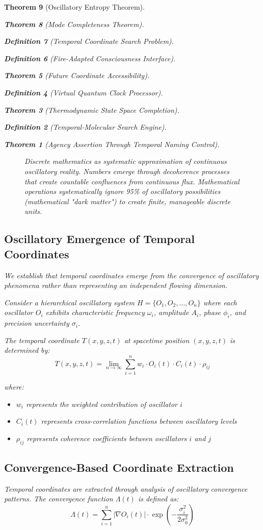 \documentclass[12pt,a4paper]{article}
\newtheorem{theorem}{Theorem}[section]
\newtheorem{definition}[theorem]{Definition}
\begin{document}
\begin{theorem}[Oscillatory Entropy Theorem]
\begin{theorem}[Mode Completeness Theorem]
\begin{enumerate}
\begin{definition}[Temporal Coordinate Search Problem]
\begin{algorithm}
\begin{definition}[Fire-Adapted Consciousness Interface]
\begin{theorem}[Future Coordinate Accessibility]
\begin{definition}[Virtual Quantum Clock Processor]
\begin{itemize}
\begin{itemize}
\begin{theorem}[Thermodynamic State Space Completion]
\begin{definition}[Temporal-Molecular Search Engine]
\begin{theorem}[Agency Assertion Through Temporal Naming Control]
\begin{remark}
\begin{figure}[h]
\begin{tikzpicture}[scale=1.1]
\end{tikzpicture}
\caption{Discrete mathematics as systematic approximation of continuous oscillatory reality. Numbers emerge through decoherence processes that create countable confluences from continuous flux. Mathematical operations systematically ignore 95\% of oscillatory possibilities (mathematical "dark matter") to create finite, manageable discrete units.}
\label{fig:discrete_mathematics}
\end{figure}

\subsection{Oscillatory Emergence of Temporal Coordinates}

We establish that temporal coordinates emerge from the convergence of oscillatory phenomena rather than representing an independent flowing dimension.

Consider a hierarchical oscillatory system $H = \{O_1, O_2, \ldots, O_n\}$ where each oscillator $O_i$ exhibits characteristic frequency $\omega_i$, amplitude $A_i$, phase $\phi_i$, and precision uncertainty $\sigma_i$.

The temporal coordinate $T(x,y,z,t)$ at spacetime position $(x,y,z,t)$ is determined by:
$$T(x,y,z,t) = \lim_{n \to \infty} \sum_{i=1}^{n} w_i \cdot O_i(t) \cdot C_i(t) \cdot \rho_{ij}$$

where:
\begin{itemize}
\item $w_i$ represents the weighted contribution of oscillator $i$
\item $C_i(t)$ represents cross-correlation functions between oscillatory levels
\item $\rho_{ij}$ represents coherence coefficients between oscillators $i$ and $j$
\end{itemize}

\subsection{Convergence-Based Coordinate Extraction}

Temporal coordinates are extracted through analysis of oscillatory convergence patterns. The convergence function $\Lambda(t)$ is defined as:
$$\Lambda(t) = \sum_{i=1}^{n} |\nabla O_i(t)| \cdot \exp\left(-\frac{\sigma_i^2}{2\sigma_0^2}\right)$$


\end{remark}
\end{theorem}
\end{definition}
\end{theorem}
\end{itemize}
\end{itemize}
\end{definition}
\end{theorem}
\end{definition}
\end{algorithm}
\end{definition}
\end{enumerate}
\end{theorem}
\end{theorem}
\end{document}
